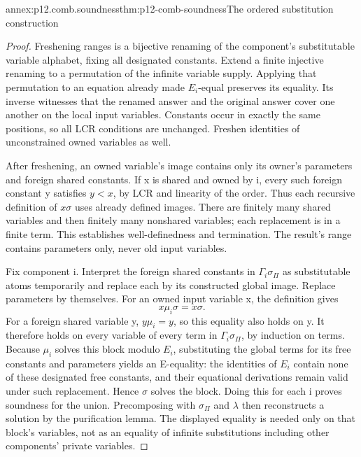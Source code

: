 \begin{annexitem}{annex:p12.comb.soundness}{thm:p12-comb-soundness}{The ordered substitution construction}
\begin{proof}
Freshening ranges is a bijective renaming of the component's
substitutable variable alphabet, fixing all designated constants.
Extend a finite injective renaming to a permutation of the infinite
variable supply. Applying that permutation to an equation already
made \(E_i\)-equal preserves its equality. Its inverse witnesses that
the renamed answer and the original answer cover one another on
the local input variables. Constants occur in exactly the same
positions, so all LCR conditions are unchanged. Freshen identities
of unconstrained owned variables as well.

After freshening, an owned variable's image contains only its owner's
parameters and foreign shared constants. If x is shared and owned by i,
every such foreign constant y satisfies \(y<x\), by LCR and linearity
of the order. Thus each recursive definition of \(x\sigma\) uses
already defined images. There are finitely many shared variables and
then finitely many nonshared variables; each replacement is in a
finite term. This establishes well-definedness and termination.
The result's range contains parameters only, never old input variables.

Fix component i. Interpret the foreign shared constants in
\(\Gamma_i\sigma_\Pi\) as substitutable atoms temporarily and
replace each by its constructed global image. Replace parameters
by themselves. For an owned input variable x, the definition gives
\[
                   x\mu_i\sigma=x\sigma.
\]
For a foreign shared variable y, \(y\mu_i=y\), so this equality
also holds on y. It therefore holds on every variable of every
term in \(\Gamma_i\sigma_\Pi\), by induction on terms.
Because \(\mu_i\) solves this block modulo \(E_i\), substituting
the global terms for its free constants and parameters yields an
E-equality: the identities of \(E_i\) contain none of these
designated free constants, and their equational derivations remain
valid under such replacement. Hence \(\sigma\) solves the block.
Doing this for each i proves soundness for the union. Precomposing
with \(\sigma_\Pi\) and \(\lambda\) then reconstructs a solution
by the purification lemma. The displayed equality is needed only
on that block's variables, not as an equality of infinite substitutions
including other components' private variables.
\end{proof}
\end{annexitem}

